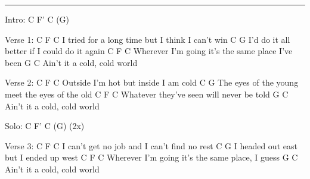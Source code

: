 \noindent\rule{\columnwidth}{1pt}

\begin{lstsong}
Intro:
C  F'  C  (G)

Verse 1:
C                             F             C
I tried for a long time but I think I can't win
C                                       G
I'd do it all better if I could do it again
    C                       F               C
Wherever I'm going it's the same place I've been
            G          C
Ain't it a cold, cold world

Verse 2:
C                      F         C
Outside I'm hot but inside I am cold
C                                          G
The eyes of the young meet the eyes of the old
    C                       F        C
Whatever they've seen will never be told
            G          C
Ain't it a cold, cold world

Solo: C  F'  C  (G) (2x)

Verse 3:
	C			                 F             C
I can't get no job and I can't find no rest
  C                              G
I headed out east but I ended up west 
    C                            F        C
Wherever I'm going it's the same place, I guess
            G          C
Ain't it a cold, cold world
\end{lstsong}
\newpage

\begin{comment}
Verse 3:
                                    F            C
Then an old lady asked me bout this new daylight time
                                            G
I said it don't matter and she said I don't mind
         C                         F        C
Then the bus driver said you still owe me a dime
            G          C
Ain't it a cold, cold world

Verse 5:
                               F          C
I might have to leave you, I think's what she said
                                        G
Wish I could sleep 'stead of tossing in bed
      C                           F          C
And I find myself thinking I'd be better off dead
            G          C
Ain't it a cold, cold world
            G          C
Ain't it a cold, cold world
\end{comment}


